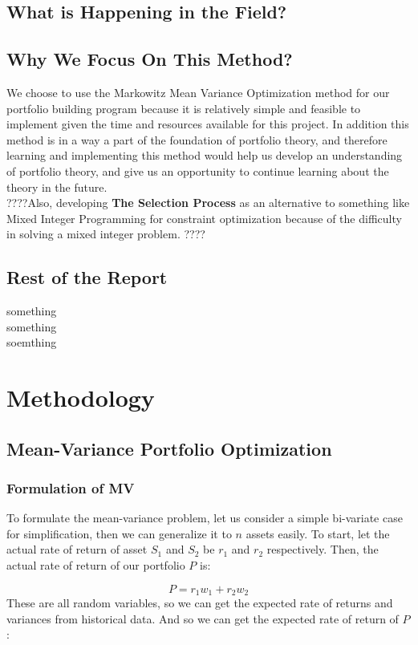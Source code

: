 \documentclass[12pt]{article}
\begin{document}
\subsection{What is Happening in the Field?}
\subsection{Why We Focus On This Method?}
We choose to use the Markowitz Mean Variance Optimization method for our portfolio building program because it is relatively simple and feasible to implement given the time and resources available for this project. In addition this method is in a way a part of the foundation of portfolio theory, and therefore learning and implementing this method would help us develop an understanding of portfolio theory, and give us an opportunity to continue learning about the theory in the future.\\

????Also, developing \textbf{The Selection Process} as an alternative to something like Mixed Integer Programming for constraint optimization because of the difficulty in solving a mixed integer problem. ????

\subsection{Rest of the Report}
something \\something\\soemthing\\
\section{Methodology}
\subsection{Mean-Variance Portfolio Optimization}
\subsubsection{Formulation of MV}

To formulate the mean-variance problem, let us consider a simple bi-variate case for simplification, then we can generalize it to $n$ assets easily. To start, let the actual rate of return of asset $S_1$ and $S_2$ be $r_1$ and $r_2$ respectively. Then, the actual rate of return of our portfolio $P$ is:

$$
P = r_1w_1 + r_2w_2
$$
These are all random variables, so we can get the expected rate of returns and variances from historical data. And so we can get the expected rate of return of $P$: 
\end{document}
